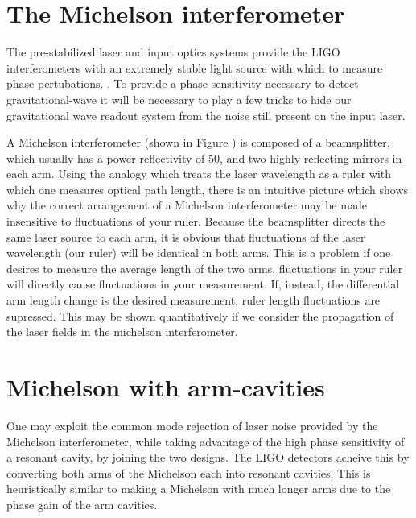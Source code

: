 \section{The Michelson interferometer}
The pre-stabilized laser and input optics systems provide the LIGO interferometers with an extremely stable light source with which to measure phase pertubations. %
. %
To provide a phase sensitivity necessary to detect gravitational-wave it will be necessary to play a few tricks to hide our gravitational wave readout system from the noise still present on the input laser.

A Michelson interferometer (shown in Figure ) is composed of a beamsplitter, which usually has a power reflectivity of 50\perc{}, and two highly reflecting mirrors in each arm. %
Using the analogy which treats the laser wavelength as a ruler with which one measures optical path length, there is an intuitive picture which shows why the correct arrangement of a Michelson interferometer may be made insensitive to fluctuations of your ruler. %
Because the beamsplitter directs the same laser source to each arm, it is obvious that fluctuations of the laser wavelength (our ruler) will be identical in both arms. %
This is a problem if one desires to measure the average length of the two arms, fluctuations in your ruler will directly cause fluctuations in your measurement. %
If, instead, the differential arm length change is the desired measurement, ruler length fluctuations are supressed. %
This may be shown quantitatively if we consider the propagation of the laser fields in the michelson interferometer.



\section{Michelson with arm-cavities}
One may exploit the common mode rejection of laser noise provided by the Michelson interferometer, while taking advantage of the high phase sensitivity of a resonant cavity, by joining the two designs. %
The LIGO detectors acheive this by converting both arms of the Michelson each into resonant cavities. %
This is heuristically similar to making a Michelson with much longer arms due to the phase gain of the arm cavities.

